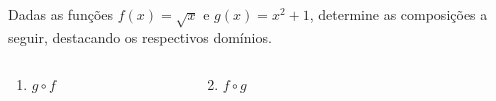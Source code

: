 \begin{frame}
  \begin{example}
    Dadas as funções $f(x) = \sqrt{x}$ e $g(x) = x^{2} + 1$, determine as composições a seguir, destacando os respectivos domínios.
    \begin{columns}[onlytextwidth]
        \begin{column}{0.2\textwidth}\vspace*{-0.4cm}
          \begin{enumerate}
            \item $g\circ f$
          \end{enumerate}
        \end{column}
        \begin{column}{0.2\textwidth}\vspace*{-0.4cm}
          \begin{enumerate}
            \setcounter{enumi}{1}
            \item $f\circ g$
          \end{enumerate}
        \end{column}
        \begin{column}{0.6\textwidth}\vspace*{-0.4cm}
        \end{column}
      \end{columns}
  \end{example}
\end{frame}


